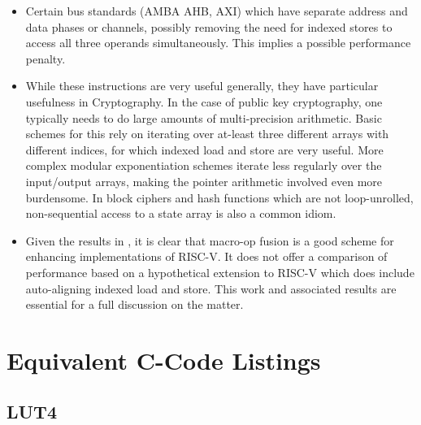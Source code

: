 \begin{itemize}
\item Certain bus standards (AMBA AHB, AXI) which have separate address and
    data phases or channels, possibly removing the need for indexed stores to
    access all three operands simultaneously.
    This implies a possible performance penalty.

\item While these instructions are very useful generally, they have
    particular usefulness in Cryptography.
    In the case of public key cryptography, one typically needs to do
    large amounts of multi-precision arithmetic.
    Basic schemes for this rely on iterating over at-least three
    different arrays with different indices, for which indexed load
    and store are very useful.
    More complex modular exponentiation schemes iterate less regularly
    over the input/output arrays, making the pointer arithmetic involved
    even more burdensome.
    In block ciphers and hash functions which are not loop-unrolled,
    non-sequential access to a state array is also a common idiom.

\item Given the results in \cite{CDPA:16}, it is clear that
    macro-op fusion is a good scheme for enhancing implementations of
    RISC-V.
    It does not offer a comparison of performance based on a
    hypothetical extension to RISC-V which does include
    auto-aligning indexed load and store.
    This work and associated results are essential for a full discussion on
    the matter.
\end{itemize}



\newpage
\section{Equivalent C-Code Listings}
\label{sec:ccode}

\subsection{LUT4}
\label{sec:ccode:lut4}

